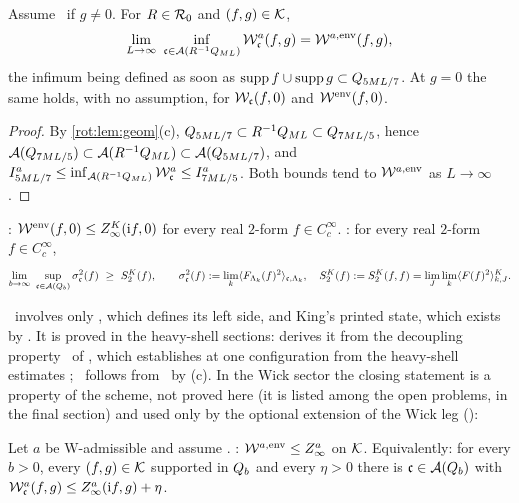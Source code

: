 \begin{lemma}\label{rot:lem:Rind}
Assume \Ka\ if $g\ne0$. For $R\in\mathcal R_0$ and $(f,g)\in\mathcal K$,
\[
\lim_{L\to\infty}\ \inf_{\fc\in\Aw{R^{-1}\Qb{ML}}}\Wv^a_\fc(f,g)=\Wenva(f,g),
\]
the infimum being defined as soon as $\operatorname{supp} f\cup\operatorname{supp} g\subset Q_{5ML/7}$. At $g=0$ the same holds, with no assumption, for $\mathcal W_{\mathfrak c}(f,0)$ and
$\mathcal W^{\mathrm{env}}(f,0)$.
\end{lemma}

\begin{proof}
By \cref{rot:lem:geom}(c), $Q_{5ML/7}\subset R^{-1}Q_{ML}\subset Q_{7ML/5}$, hence
$\mathcal A(Q_{7ML/5})\subset\mathcal A(R^{-1}Q_{ML})\subset\mathcal A(Q_{5ML/7})$, and
$I^a_{5ML/7}\le\inf_{\mathcal A(R^{-1}Q_{ML})}\mathcal W^a_{\mathfrak c}\le I^a_{7ML/5}$. Both bounds tend to $\mathcal W^{a,\mathrm{env}}$ as $L\to\infty$.
\end{proof}

\begin{theorem}\label{rot:hyp:TIGHT}
\textbf{\TIz}: $\mathcal W^{\mathrm{env}}(f,0)\le Z^{K}_{\infty}(\mathrm if,0)$ for every real $2$-form $f\in C^\infty_c$.
\textbf{\TItwo}: for every real $2$-form $f\in C^\infty_c$,
\[
\lim_{b\to\infty}\ \sup_{\mathfrak c\in\mathcal A(Q_{b})}\sigma^2_{\mathfrak c}(f)\ \ge\ S^K_2(f),\qquad
\sigma^2_{\mathfrak c}(f):=\lim_k\langle F_{\Lambda_k}(f)^2\rangle_{\mathfrak c,\Lambda_k},\quad
S^K_2(f):= S^K_2(f,f)=\lim_J\lim_k\langle F(f)^2\rangle^{K}_{k,J}.
\]
\end{theorem}

\TIz\ involves only \Kz, which defines its left side, and King's printed state, which exists by \EC. It is proved in the heavy-shell sections:  derives it from the decoupling property \REz\ of , which  establishes at one configuration from the heavy-shell estimates \HS; \TItwo\ follows from \TIz\ by (c). In the Wick sector the closing statement is a property of the scheme, not proved here (it is listed among the open problems, in the final section) and used only by the optional extension of the Wick leg ():

\begin{definition}\label{rot:hyp:TIa}
Let $a$ be $\mathrm W$-admissible and assume \Ka. \textbf{\TIa}: $\mathcal W^{a,\mathrm{env}}\le Z^a_\infty$ on $\mathcal K$. Equivalently: for every $b>0$, every $(f,g)\in\mathcal K$ supported in $Q_{b}$ and every $\eta>0$
there is $\mathfrak c\in\mathcal A(Q_{b})$ with $\mathcal W^a_{\mathfrak c}(f,g)\le Z^a_\infty(\mathrm if,g)+\eta$.
\end{definition}

